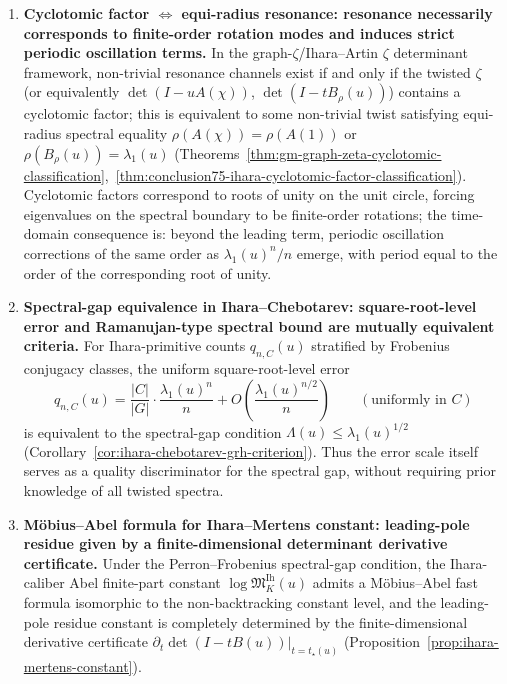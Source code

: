 \begin{enumerate}
  \item \textbf{Cyclotomic factor \texorpdfstring{$\Longleftrightarrow$}{<->} equi-radius resonance: resonance necessarily corresponds to finite-order rotation modes and induces strict periodic oscillation terms.}
  In the graph-\(\zeta\)/Ihara--Artin \(\zeta\) determinant framework, non-trivial resonance channels exist if and only if the twisted \(\zeta\) (or equivalently \(\det(I-uA(\chi))\), \(\det(I-tB_\rho(u))\)) contains a cyclotomic factor; this is equivalent to some non-trivial twist satisfying equi-radius spectral equality
  \(\rho(A(\chi))=\rho(A(1))\)
  or
  \(\rho(B_\rho(u))=\lambda_1(u)\)
  (Theorems~\ref{thm:gm-graph-zeta-cyclotomic-classification},~\ref{thm:conclusion75-ihara-cyclotomic-factor-classification}).
  Cyclotomic factors correspond to roots of unity on the unit circle, forcing eigenvalues on the spectral boundary to be finite-order rotations; the time-domain consequence is: beyond the leading term, periodic oscillation corrections of the same order as \(\lambda_1(u)^n/n\) emerge, with period equal to the order of the corresponding root of unity.

  \item \textbf{Spectral-gap equivalence in Ihara--Chebotarev: square-root-level error and Ramanujan-type spectral bound are mutually equivalent criteria.}
  For Ihara-primitive counts \(q_{n,C}(u)\) stratified by Frobenius conjugacy classes, the uniform square-root-level error
  \[
  q_{n,C}(u)=\frac{|C|}{|G|}\cdot\frac{\lambda_1(u)^n}{n}
  +O\!\left(\frac{\lambda_1(u)^{n/2}}{n}\right)
  \qquad(\text{uniformly in }C)
  \]
  is equivalent to the spectral-gap condition \(\Lambda(u)\le \lambda_1(u)^{1/2}\) (Corollary~\ref{cor:ihara-chebotarev-grh-criterion}).
  Thus the error scale itself serves as a quality discriminator for the spectral gap, without requiring prior knowledge of all twisted spectra.

  \item \textbf{Möbius--Abel formula for Ihara--Mertens constant: leading-pole residue given by a finite-dimensional determinant derivative certificate.}
  Under the Perron--Frobenius spectral-gap condition, the Ihara-caliber Abel finite-part constant \(\log\mathfrak{M}^{\mathrm{Ih}}_K(u)\) admits a Möbius--Abel fast formula isomorphic to the non-backtracking constant level, and the leading-pole residue constant is completely determined by the finite-dimensional derivative certificate
  \(
  \partial_t\det(I-tB(u))|_{t=t_\star(u)}
  \)
  (Proposition~\ref{prop:ihara-mertens-constant}).


\end{enumerate}
